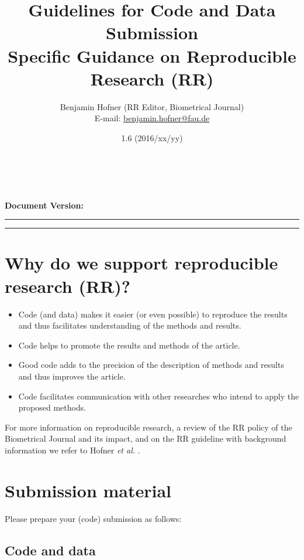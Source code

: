 \documentclass[12pt,a4paper]{article}
\title{\LARGE Guidelines for Code and Data Submission\\[0.2em]
  \large Specific Guidance on Reproducible Research (RR)}
\author{Benjamin Hofner (RR Editor, Biometrical Journal)\\
  E-mail: \href{mailto:benjamin.hofner@fau.de}{benjamin.hofner@fau.de}}
\date{1.6 (2016/xx/yy)}
\makeatletter
\renewcommand{\maketitle}{\bgroup\setlength{\parindent}{0pt}
  \begin{flushleft}
    \vspace*{0cm}
    \textbf{\Large \@title}\\[1em]

    \@author\\[0.5em]

    \textbf{Document Version:} \@date
    \vspace{1em}
  \end{flushleft}\egroup
}
\makeatother
\begin{document}
\maketitle

\hrule
\vspace{-0.7em}
\tableofcontents

\vspace{1em}
\hrule
\vspace{0.5cm}

\setlength{\parskip}{0.2em}

\section*{Why do we support reproducible research (RR)?}
\begin{itemize}
\item Code (and data) makes it easier (or even possible) to reproduce the results
  and thus facilitates understanding of the methods and results.
\item Code helps to promote the results and methods of the article.
\item Good code adds to the precision of the description of methods and results
  and thus improves the article.
\item Code facilitates communication with other researches who intend to apply
  the proposed methods.
\end{itemize}

For more information on reproducible research, a review of the RR policy of the
Biometrical Journal and its impact, and on the RR guideline with background
information we refer to Hofner \emph{et al.} \cite{Hofner:2015}.


\newpage
\setcounter{section}{0}

\section{Submission material}

Please prepare your (code) submission as follows:

\subsection{Code and data}
\end{document}
